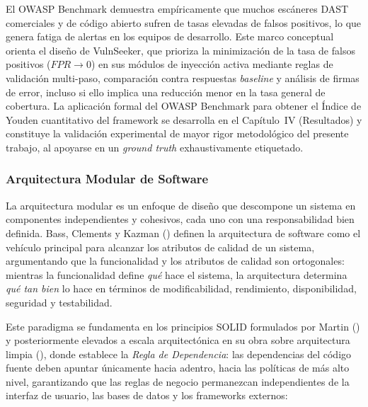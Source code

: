 \documentclass[12pt, a4paper]{article}
\begin{document}
El OWASP Benchmark demuestra empíricamente que muchos escáneres DAST
comerciales y de código abierto sufren de tasas elevadas de falsos positivos,
lo que genera fatiga de alertas en los equipos de desarrollo. Este marco
conceptual orienta el diseño de VulnSeeker, que prioriza la minimización de la
tasa de falsos positivos ($FPR \to 0$) en sus módulos de inyección activa
mediante reglas de validación multi-paso, comparación contra respuestas
\textit{baseline} y análisis de firmas de error, incluso si ello implica una
reducción menor en la tasa general de cobertura. La aplicación formal del OWASP
Benchmark para obtener el Índice de Youden cuantitativo del framework se desarrolla
en el Capítulo~IV (Resultados) y constituye la validación experimental de mayor
rigor metodológico del presente trabajo, al apoyarse en un \textit{ground truth}
exhaustivamente etiquetado.

\subsubsection{Arquitectura Modular de Software}


La arquitectura modular es un enfoque de diseño que descompone un sistema en
componentes independientes y cohesivos, cada uno con una responsabilidad bien
definida. Bass, Clements y Kazman (\citeyear*{bass2012}) definen la
arquitectura de software como el vehículo principal para alcanzar los
atributos de calidad de un sistema, argumentando que la funcionalidad y los
atributos de calidad son ortogonales: mientras la funcionalidad define
\textit{qué} hace el sistema, la arquitectura determina \textit{qué tan bien}
lo hace en términos de modificabilidad, rendimiento, disponibilidad,
seguridad y testabilidad.

Este paradigma se fundamenta en los principios SOLID formulados por
Martin (\citeyear*{martin2003}) y posteriormente elevados a escala
arquitectónica en su obra sobre arquitectura limpia (\cite{martin2017}),
donde establece la \textit{Regla de Dependencia}: las dependencias del
código fuente deben apuntar únicamente hacia adentro, hacia las políticas
de más alto nivel, garantizando que las reglas de negocio permanezcan
independientes de la interfaz de usuario, las bases de datos y los
frameworks externos:
\end{document}
